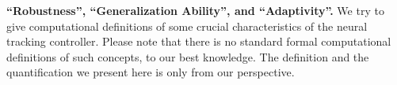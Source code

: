 \begin{table*}[t]
    \centering
    \caption{ 
    \textbf{Adaptativity score (GRAB dataset).}   numbers for best values.
    } 
    \label{tb_supp_adaptiviity_score}
\end{table*} 


\textcolor{myblue}{
\noindent\textbf{``Robustness'', ``Generalization Ability'', and ``Adaptivity''.} 
We try to give computational definitions of some crucial characteristics of the neural tracking controller. Please note that there is no standard formal computational definitions of such concepts, to our best knowledge. The definition and the quantification we present here is only from our perspective. 
}


